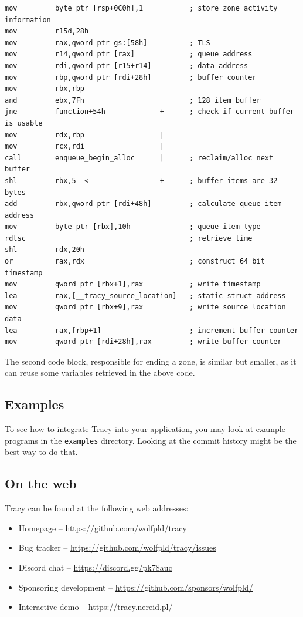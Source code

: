 \documentclass[hidelinks,titlepage,a4paper]{article}
\begin{document}
\begin{lstlisting}[language={[x86masm]Assembler}]
mov         byte ptr [rsp+0C0h],1           ; store zone activity information
mov         r15d,28h
mov         rax,qword ptr gs:[58h]          ; TLS
mov         r14,qword ptr [rax]             ; queue address
mov         rdi,qword ptr [r15+r14]         ; data address
mov         rbp,qword ptr [rdi+28h]         ; buffer counter
mov         rbx,rbp
and         ebx,7Fh                         ; 128 item buffer
jne         function+54h  -----------+      ; check if current buffer is usable
mov         rdx,rbp                  |
mov         rcx,rdi                  |
call        enqueue_begin_alloc      |      ; reclaim/alloc next buffer
shl         rbx,5  <-----------------+      ; buffer items are 32 bytes
add         rbx,qword ptr [rdi+48h]         ; calculate queue item address
mov         byte ptr [rbx],10h              ; queue item type
rdtsc                                       ; retrieve time
shl         rdx,20h
or          rax,rdx                         ; construct 64 bit timestamp
mov         qword ptr [rbx+1],rax           ; write timestamp
lea         rax,[__tracy_source_location]   ; static struct address
mov         qword ptr [rbx+9],rax           ; write source location data
lea         rax,[rbp+1]                     ; increment buffer counter
mov         qword ptr [rdi+28h],rax         ; write buffer counter
\end{lstlisting}

The second code block, responsible for ending a zone, is similar but smaller, as it can reuse some variables retrieved in the above code.

\subsection{Examples}

To see how to integrate Tracy into your application, you may look at example programs in the \texttt{examples} directory. Looking at the commit history might be the best way to do that.

\subsection{On the web}

Tracy can be found at the following web addresses:

\begin{itemize}
\item Homepage -- \url{https://github.com/wolfpld/tracy}
\item Bug tracker -- \url{https://github.com/wolfpld/tracy/issues}
\item Discord chat -- \url{https://discord.gg/pk78auc}
\item Sponsoring development -- \url{https://github.com/sponsors/wolfpld/}
\item Interactive demo -- \url{https://tracy.nereid.pl/}
\end{itemize}
\end{document}

